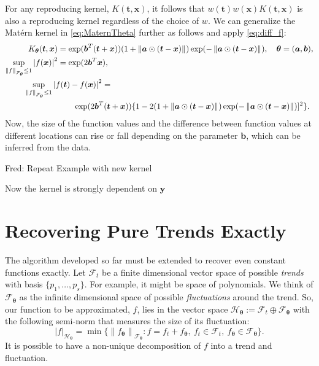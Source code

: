 \documentclass[]{mcom-l}
\theoremstyle{remark}
\newcommand{\ba}{{\boldsymbol{a}}}
\newcommand{\bb}{{\boldsymbol{b}}}
\newcommand{\bx}{{\boldsymbol{x}}}
\newcommand{\by}{{\boldsymbol{y}}}
\newcommand{\bt}{{\boldsymbol{t}}}
\newcommand{\btheta}{{\boldsymbol{\theta}}}
\newcommand{\calf}{{\mathcal{F}}}
\newcommand{\calh}{{\mathcal{H}}}
\def\abs#1{\ensuremath{\left \lvert #1 \right \rvert}}
\newcommand{\norm}[2][{}]{\ensuremath{\left \lVert #2 \right \rVert}_{#1}}
\newcommand{\FredNote}[1]{{\color{blue}Fred: #1}}
\begin{document}
For any reproducing kernel, $K(\bt ,\bx)$, it follows that $w(\bt)w(\bx)K(\bt ,\bx)$ is also a reproducing kernel regardless of the choice of $w$.  We can generalize the Mat\'ern kernel in \eqref{eq:MaternTheta} further as follows and apply \eqref{eq:diff_f}:
\begin{align} \label{eq:MaternAB}
K_\btheta(\bt,\bx) &= \exp(\bb^T(\bt + \bx))(1 +  \norm{\ba \odot (\bt-\bx)}) \exp(-\norm{\ba \odot (\bt-\bx)}),  \quad \btheta=(\ba, \bb), \\
\nonumber
\sup_{\norm[\calf_{\btheta}]{f} \le 1} \abs{f(\bx)}^2 &= \exp(2\bb^T\bx), \\
\nonumber
\MoveEqLeft[4]{\sup_{\norm[\calf_{\btheta}]{f} \le 1} \abs{f(\bt) - f(\bx)}^2} = \\
\nonumber 
& \qquad \exp(2\bb^T(\bt + \bx))\{ 1 - 2 (1 +  \norm{\ba \odot (\bt-\bx)}) \exp(-\norm{\ba \odot (\bt-\bx)})]^2\}.
\end{align}
Now, the size of the function values and the difference between function values at different locations can rise or fall depending on the parameter $\bb$, which can be inferred from the data.


\FredNote{Repeat Example with new kernel}

Now the kernel is strongly dependent on $\by$

\section{Recovering Pure Trends Exactly} \label{sec:poly}

The algorithm developed so far must be extended to recover even constant functions exactly.  Let $\calf_t$ be a finite dimensional vector space of possible \emph{trends} with basis $\{p_1, \ldots, p_s\}$.  For example, it might be space of polynomials.  We think of $\calf_{\btheta}$ as the infinite dimensional space of possible \emph{fluctuations} around the trend.  So, our function to be approximated, $f$, lies in the vector space $\calh_\btheta := \calf_t \oplus \calf_\btheta$ with the following semi-norm that measures the size of its fluctuation:
\begin{equation} \label{eq:seminorm} 
\abs{f}_{\calh_\btheta} = \min \{ \norm[\calf_\btheta] {f_\btheta} : f = f_t + f_\btheta, \ f_t \in \calf_t, \ f_\btheta \in \calf_\btheta \}.
\end{equation}
It is possible to have a non-unique decomposition of $f$ into a trend and fluctuation.
\end{document}
